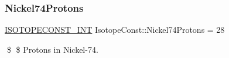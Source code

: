 \subsubsection{\texorpdfstring{Nickel74\+Protons}{Nickel74Protons}}
{\footnotesize\ttfamily \mbox{\hyperlink{group___isotope_const-_macros_ga5f18360b3e99483a35c32d789e62621c}{I\+S\+O\+T\+O\+P\+E\+C\+O\+N\+S\+T\+\_\+\+I\+NT}} Isotope\+Const\+::\+Nickel74\+Protons = 28}

\$ \$ Protons in Nickel-\/74. 